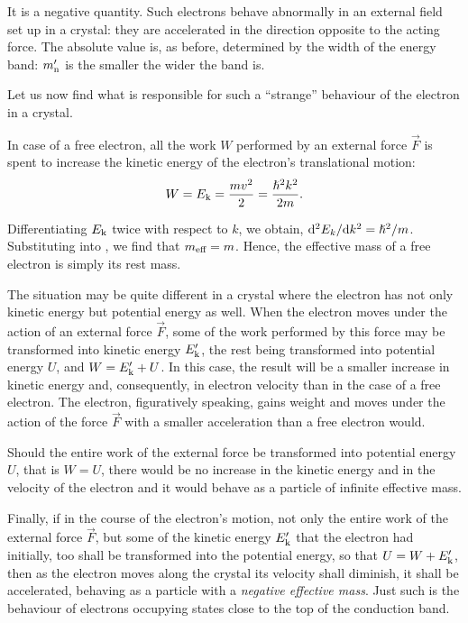 \noindent
It is a negative quantity. Such electrons behave abnormally in an external field set up in a crystal: they are accelerated in the direction opposite to the acting force. The absolute value is, as before, determined by the width of the energy band: $m_{\text{n}}'$ is the smaller the wider the band is.

Let us now find what is responsible for such a ``strange'' behaviour of the electron in a crystal.

In case of a free electron, all the work $W$ performed by an external force $\vec{F}$ is spent to increase the kinetic energy of the electron's translational motion:
\begin{equation*}
    W = E_{\text{k}} = \frac{mv^2}{2} = \frac{\hslash^2 k^2}{2m}.
\end{equation*}

\noindent
Differentiating $E_{\text{k}}$ twice with respect to $k$, we obtain, $\mathrm{d}^{2}E_k/\mathrm{d} k^{2}=\hslash^2/m$. Substituting into , we find that $m_{\text{eff}}=m$. Hence, the effective mass of a free electron is simply its rest mass.

The situation may be quite different in a crystal where the electron has not only kinetic energy but potential energy as well. When the electron moves under the action of an external force $\vec{F}$, some of the work performed by this force may be transformed into kinetic energy $E_{\text{k}}'$, the rest being transformed into potential energy $U$, and $W=E_{\text{k}}'+U$. In this case, the result will be a smaller increase in kinetic energy and, consequently, in electron velocity than in the case of a free electron. The electron, figuratively speaking, gains weight and moves under the action of the force $\vec{F}$ with a smaller acceleration than a free electron would.

Should the entire work of the external force be transformed into potential energy $U$, that is $W=U$, there would be no increase in the kinetic energy and in the velocity of the electron and it would behave as a particle of infinite effective mass.

Finally, if in the course of the electron's motion, not only the entire work of the external force $\vec{F}$, but some of the kinetic energy $E_{\text{k}}'$ that the electron had initially, too shall be transformed into the potential energy, so that $U=W+E_{\text{k}}'$, then as the electron moves along the crystal its velocity shall diminish, it shall be accelerated, behaving as a particle with a \textit{negative effective mass}. Just such is the behaviour of electrons occupying states close to the top of the conduction band.

